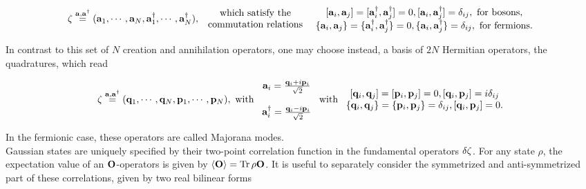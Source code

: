 \documentclass{homework}
\begin{document}
\begin{equation}
    \zeta \overset{{\bf a}, {\bf a}^\dagger}{=} ({\bf a}_1, \cdots, {\bf a}_N, {\bf a}_1^\dagger, \cdots, {\bf a}_N^\dagger),
    \begin{array}{cc}
         \textnormal{ which satisfy the } \\
         \textnormal{ commutation relations }
    \end{array}
    \begin{array}{cc}
         [{\bf a}_i, {\bf a}_j] = [{\bf a}_i^{\dagger}, {\bf a}_j^{\dagger}] = 0, [{\bf a}_i, {\bf a}_j^\dagger] = \delta_{ij}, \textnormal{ for bosons}, \\
         \{{\bf a}_i, {\bf a}_j\} = \{{\bf a}_i^{\dagger}, {\bf a}_j^{\dagger}\} = 0, \{{\bf a}_i, {\bf a}_j^\dagger\} = \delta_{ij}, \textnormal{ for fermions}.
    \end{array}
\end{equation}

In contrast to this set of $N$ creation and annihilation operators, one may choose instead, a basis of $2N$ Hermitian operators, the quadratures, which read

\begin{equation}
    \zeta \overset{{\bf a}, {\bf a}^\dagger}{=} ({\bf q}_1, \cdots, {\bf q}_N, {\bf p}_1, \cdots, {\bf p}_N), \textnormal{ with } \begin{array}{cc}
         {\bf a}_i = \frac{{\bf q}_i + i {\bf p}_i}{\sqrt{2}}  \\
         \\
         {\bf a}_i^\dagger = \frac{{\bf q}_i - i {\bf p}_i}{\sqrt{2}}  \\
    \end{array} \textnormal{ with } \begin{array}{cc}
         [{\bf q}_i, {\bf q}_j] = [{\bf p}_i, {\bf p}_j] = 0, [{\bf q}_i, {\bf p}_j] = i\delta_{ij} \\ 
         \{{\bf q}_i, {\bf q}_j\} = \{{\bf p}_i, {\bf p}_j\} = \delta_{ij}, [{\bf q}_i, {\bf p}_j] = 0.
    \end{array}
\end{equation}

In the fermionic case, these operators are called Majorana modes. \\

Gaussian states are uniquely specified by their two-point correlation function in the fundamental operators $\var{\zeta}$. For any state $\rho$, the expectation value of an ${\bf O}$-operators is given by $\langle {\bf O} \rangle = \Tr \rho {\bf O}$. It is useful to separately consider the symmetrized and anti-symmetrized part of these correlations, given by two real bilinear forms
\end{document}
